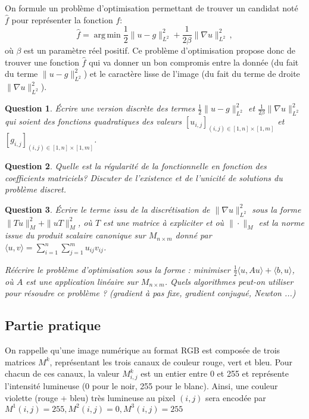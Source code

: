 \documentclass[10pt,a4paper,fleqn]{report}
\DeclareMathOperator*{\argmin}{arg\,min}
\newtheorem{question}{Question}
\begin{document}
On formule un probl\`eme d'optimisation permettant de trouver un
candidat not\'e $\hat{f}$ pour repr\'esenter la fonction $f$:
\begin{equation}
\hat{f} = \argmin \frac12 \| u -  g\|_{L^2}^2 + \frac{1}{2\beta}\| \nabla u \|^2_{L^2}\,,
\end{equation}
o\`u $\beta$ est un param\`etre r\'eel positif.  Ce probl\`eme
d'optimisation propose donc de trouver une fonction $\hat{f}$ qui va
donner un bon compromis entre la donn\'ee (du fait du terme $ \| u -
g\|_{L^2}^2 $) et le caractère lisse de l'image (du fait du terme de
droite $\| \nabla u \|^2_{L^2}$).

\begin{question}
\'Ecrire une version discr\`ete des termes $\frac12 \| u -  g\|_{L^2}^2$ et $\frac{1}{2\beta}\| \nabla u \|^2_{L^2}$ qui soient des fonctions quadratiques des valeurs $[u_{i,j}]_{(i,j)\in [1,n]\times[1,m]}$ et $[g_{i,j}]_{(i,j)\in [1,n]\times[1,m]}$.
\end{question}

\begin{question}
Quelle est la r\'egularit\'e de la fonctionnelle en fonction des coefficients matriciels?
Discuter de l'existence et de l'unicit\'e de solutions du probl\`eme discret.
\end{question}

\begin{question}
  Écrire le terme issu de la discrétisation de $\| \nabla u
  \|^2_{L^2}$ sous la forme $\|Tu\|^{2}_{M} + \|u T\|^{2}_{M}$, où
  $T$ est une matrice à expliciter et où $\|\cdot\|_{M}$ est la norme
  issue du produit scalaire canonique sur $M_{n \times m}$ donné par
  $\langle u,v \rangle = \sum_{i=1}^{n}\sum_{j=1}^{m} u_{ij} v_{ij}$.

  Réécrire le problème d'optimisation sous la forme : minimiser $\frac
  1 2 \langle u, Au\rangle + \langle b, u\rangle$, où $A$ est une
  application linéaire sur $M_{n\times m}$. Quels algorithmes peut-on
  utiliser pour résoudre ce problème ? (gradient à pas fixe, gradient
  conjugué, Newton ...)
\end{question}

\subsection{Partie pratique}

On rappelle qu'une image numérique au format RGB est composée de trois
matrices $M^{k}$, représentant les trois canaux de couleur rouge, vert
et bleu. Pour chacun de ces canaux, la valeur $M^{k}_{i,j}$ est un
entier entre 0 et 255 et représente l'intensité lumineuse (0 pour le
noir, 255 pour le blanc). Ainsi, une couleur violette (rouge + bleu)
très lumineuse au pixel $(i,j)$ sera encodée par $M^{1}(i,j) = 255,
M^{2}(i,j) = 0, M^{3}(i,j) = 255$
\end{document}
